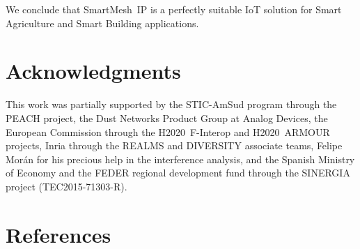 \documentclass{elsarticle}
\newcommand{\smip}                {SmartMesh~IP\xspace}
\newcommand{\building}            {Smart Building\xspace}
\newcommand{\agri}                {Smart Agriculture\xspace}
\begin{document}
We conclude that \smip is a perfectly suitable IoT solution for \agri and \building applications.

\section*{Acknowledgments}

This work was partially supported by
the STIC-AmSud program through the PEACH project,
the Dust Networks Product Group at Analog Devices,
the European Commission through the H2020~F-Interop and H2020~ARMOUR projects,
Inria through the REALMS and DIVERSITY associate teams,
Felipe Mor{\'{a}}n for his precious help in the interference analysis,
and the Spanish Ministry of Economy and the FEDER regional development fund through the SINERGIA project (TEC2015-71303-R).

\section*{References}


\end{document}
